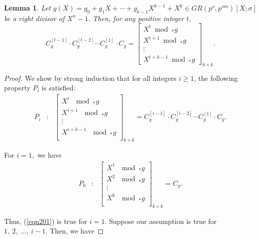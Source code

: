 \documentclass[11pt]{article}
\newtheorem{lemma}{Lemma}
\begin{document}
\begin{lemma}\label{companiontocyclic}
    Let $g(X)=g_0+g_1X+\cdots+g_{k-1}X^{k-1}+X^k\in GR(p^s,p^{sm})[X;\sigma]$ be a right divisor of $X^n-1.$ 
    Then, for any positive integer $t$,
    \[
    C^{[t-1]}_g \cdot C^{[t-2]}_g \cdots C^{[1]}_g \cdot C_g =
    \begin{bmatrix}
        X^t \bmod_\ast g\\
        X^{t+1} \bmod_\ast g\\
        \vdots\\
        X^{t+k-1} \bmod_\ast g
    \end{bmatrix}_{k\times k}.
    \]
\end{lemma}
\begin{proof}
    	We show by strong induction that for all integers $i\geq 1$, the following property $P_i$ is satisfied:
	\begin{eqnarray}\label{eqn201}
		P_i&:&\begin{bmatrix}
			X^i ~ \mod _*g \\
			X^{i+1} ~ \mod _*g  \\
			\vdots\\
			X^{i+k-1} ~ \mod _*g  \\
		\end{bmatrix}_{k\times k}=C^{[i-1]}_g\cdot C^{[i-2]}_g\cdots C^{[1]}_g\cdot C_g.
	\end{eqnarray}	
    
    For $i=1,$ we have 
	\begin{eqnarray}
		P_0&:&\begin{bmatrix}
			X^1 ~ \mod _*g  \\
			X^{2} ~ \mod _*g  \\
			\vdots\\
			X^{k} ~ \mod _*g  \\
			
		\end{bmatrix}_{k\times k}=C_g.
	\end{eqnarray}
    
	Thus, (\ref{eqn201}) is true for $i=1$. Suppose our assumption is true for $1,~2,~\dots,~i-1$. Then, we have
	
	

\end{proof}
\end{document}
